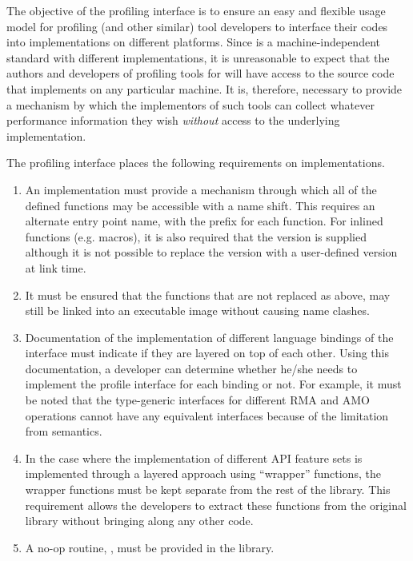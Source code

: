 The objective of the \openshmem profiling interface is to ensure an 
easy and flexible usage model for profiling (and other similar) 
tool developers to interface their codes into \openshmem 
implementations on different platforms. Since \openshmem is a 
machine-independent standard with different implementations, it is 
unreasonable to expect that the authors and developers of profiling 
tools for \openshmem will have access to the source code that 
implements \openshmem on any particular machine. It is, therefore,  
necessary to provide a mechanism by which the implementors of such 
tools can collect whatever performance information they wish 
\textit{without} access to the underlying implementation.

The \openshmem profiling interface places the following requirements 
on implementations. 

\begin{enumerate}
\item An \openshmem implementation must provide a mechanism through 
which all of the \openshmem defined functions may be accessible 
with a name shift. This requires an alternate 
entry point name, with the prefix  for each 
\openshmem function. For \openshmem inlined functions (e.g. macros), 
it is also required that the  version is supplied 
although it is not possible to replace the  version 
with a user-defined version at link time.
\item It must be ensured that the \openshmem functions that are not 
replaced as above, may still be linked into an executable image 
without causing name clashes. 
\item Documentation of the implementation of different language 
bindings of the \openshmem interface must indicate if they 
are layered on top of each other. Using this documentation, a  
developer can determine whether he/she needs to implement the 
profile interface for each binding or not. For example, it must 
be noted that the \openshmem \Cstd[11] type-generic interfaces for 
different RMA and AMO operations cannot have any equivalent 
 interfaces because of the limitation from \Cstd 
{} semantics. 
\item In the case where the implementation of different API  
feature sets is implemented through a layered approach using 
``wrapper'' functions, the wrapper functions must be kept separate 
from the rest of the library. This requirement allows the developers 
to extract these functions from the original \openshmem library 
without bringing along any other code.
\item A no-op routine, , must be provided 
in the library.
\end{enumerate}

